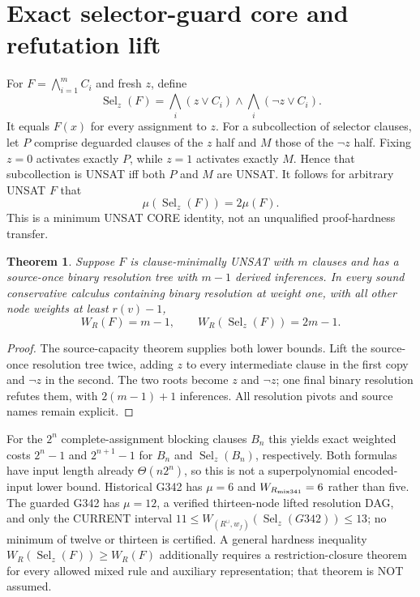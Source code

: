 \documentclass[11pt]{article}
\newtheorem{theorem}{Theorem}
\begin{document}
\section{Exact selector-guard core and refutation lift}
For $F=\bigwedge_{i=1}^m C_i$ and fresh $z$, define
\[
\operatorname{Sel}_z(F)=\bigwedge_i(z\vee C_i)\land\bigwedge_i(\neg z\vee C_i).
\]
It equals $F(x)$ for every assignment to $z$. For a subcollection of selector clauses, let $P$ comprise deguarded clauses of the $z$ half and $M$ those of the $\neg z$ half. Fixing $z=0$ activates exactly $P$, while $z=1$ activates exactly $M$. Hence that subcollection is UNSAT iff both $P$ and $M$ are UNSAT. It follows for arbitrary UNSAT $F$ that
\[
\boxed{\mu(\operatorname{Sel}_z(F))=2\mu(F).}
\]
This is a minimum UNSAT CORE identity, not an unqualified proof-hardness transfer.
\begin{theorem}
Suppose $F$ is clause-minimally UNSAT with $m$ clauses and has a source-once binary resolution tree with $m-1$ derived inferences. In every sound conservative calculus containing binary resolution at weight one, with all other node weights at least $r(v)-1$,
\[
\boxed{W_R(F)=m-1,\qquad W_R(\operatorname{Sel}_z(F))=2m-1.}
\]
\end{theorem}
\begin{proof}
The source-capacity theorem supplies both lower bounds. Lift the source-once resolution tree twice, adding $z$ to every intermediate clause in the first copy and $\neg z$ in the second. The two roots become $z$ and $\neg z$; one final binary resolution refutes them, with $2(m-1)+1$ inferences. All resolution pivots and source names remain explicit.
\end{proof}
For the $2^n$ complete-assignment blocking clauses $B_n$ this yields exact weighted costs $2^n-1$ and $2^{n+1}-1$ for $B_n$ and $\operatorname{Sel}_z(B_n)$, respectively. Both formulas have input length already $\Theta(n2^n)$, so this is not a superpolynomial encoded-input lower bound. Historical G342 has $\mu=6$ and $W_{R_{\rm mix341}}=6$ rather than five. The guarded G342 has $\mu=12$, a verified thirteen-node lifted resolution DAG, and only the CURRENT interval $11\le W_{(R^\cup,w_f)}(\operatorname{Sel}_z(G342))\le13$; no minimum of twelve or thirteen is certified. A general hardness inequality $W_R(\operatorname{Sel}_z(F))\ge W_R(F)$ additionally requires a restriction-closure theorem for every allowed mixed rule and auxiliary representation; that theorem is NOT assumed.
\end{document}

